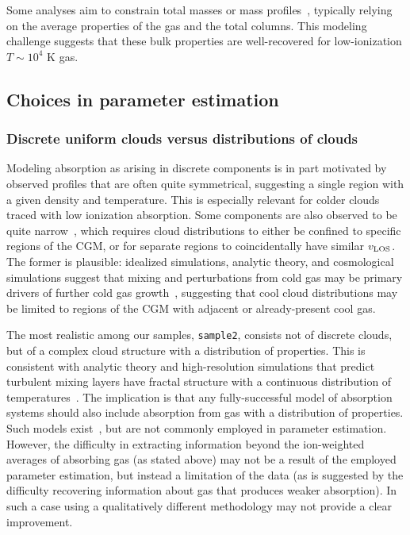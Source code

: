 \documentclass[fleqn,usenatbib]{mnras}
\begin{document}
Some analyses aim to constrain total masses or mass profiles~\citep[e.g.][]{zahedy2019Characterizing}, typically relying on the average properties of the gas and the total columns.
This modeling challenge suggests that these bulk properties are well-recovered for low-ionization $T \sim 10^4$ K gas.

\subsection{Choices in parameter estimation}
\label{s: discussion -- modeling choices}

\subsubsection{Discrete uniform clouds versus distributions of clouds}

Modeling absorption as arising in discrete components is in part motivated by observed profiles that are often quite symmetrical,
suggesting a single region with a given density and temperature. 
This is especially relevant for colder clouds traced with low ionization absorption.
Some components are also observed to be quite narrow~\citep[e.g.][]{churchill1999Population, churchill2001Kinematics}, 
which requires cloud distributions to either be confined to specific regions of the CGM,
or for separate regions to coincidentally have similar $v_{\rm LOS}$.
The former is plausible:
idealized simulations, analytic theory, and cosmological simulations suggest that mixing and perturbations from cold gas may be primary drivers of further cold gas growth~\citep[e.g.][]{nelson2020Resolving, esmerian2021Thermal, gronke2021Survival, gronke2022Cooling, ramesh2022Circumgalactic},
suggesting that cool cloud distributions may be limited to regions of the CGM with adjacent or already-present cool gas.

The most realistic among our samples, \texttt{sample2}, consists not of discrete clouds, but of a complex cloud structure with a distribution of properties.
This is consistent with analytic theory and high-resolution simulations that predict turbulent mixing layers have fractal structure with a continuous distribution of temperatures~\citep[e.g.][]{Tan2021Model}.
The implication is that any fully-successful model of absorption systems should also include absorption from gas with a distribution of properties.
Such models exist~\citep[e.g.][]{stern2016Universal}, but are not commonly employed in parameter estimation.
However, the difficulty in extracting information beyond the ion-weighted averages of absorbing gas (as stated above) may not be a result of the employed parameter estimation,
but instead a limitation of the data (as is suggested by the difficulty recovering information about gas that produces weaker absorption).
In such a case using a qualitatively different methodology may not provide a clear improvement.
\end{document}
